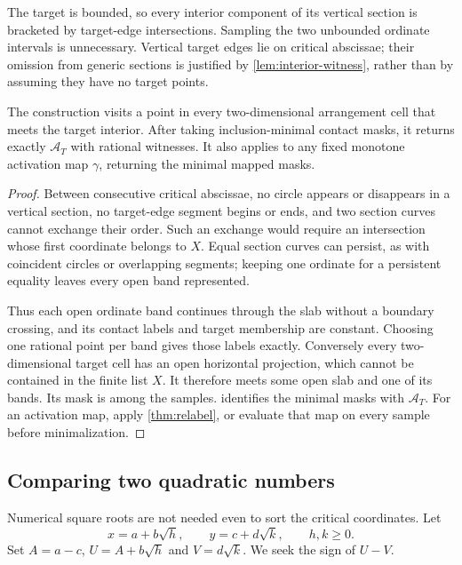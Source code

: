 The target is bounded, so every interior component of its vertical section is bracketed by target-edge intersections. Sampling the two unbounded ordinate intervals is unnecessary. Vertical target edges lie on critical abscissae; their omission from generic sections is justified by \cref{lem:interior-witness}, rather than by assuming they have no target points.

\begin{theorem}\label{thm:sweep}
The construction visits a point in every two-dimensional arrangement cell that meets the target interior. After taking inclusion-minimal contact masks, it returns exactly $\mathcal A_T$ with rational witnesses. It also applies to any fixed monotone activation map $\gamma$, returning the minimal mapped masks.
\end{theorem}
\begin{proof}
Between consecutive critical abscissae, no circle appears or disappears in a vertical section, no target-edge segment begins or ends, and two section curves cannot exchange their order. Such an exchange would require an intersection whose first coordinate belongs to $X$. Equal section curves can persist, as with coincident circles or overlapping segments; keeping one ordinate for a persistent equality leaves every open band represented.

Thus each open ordinate band continues through the slab without a boundary crossing, and its contact labels and target membership are constant. Choosing one rational point per band gives those labels exactly. Conversely every two-dimensional target cell has an open horizontal projection, which cannot be contained in the finite list $X$. It therefore meets some open slab and one of its bands. Its mask is among the samples.  identifies the minimal masks with $\mathcal A_T$. For an activation map, apply \cref{thm:relabel}, or evaluate that map on every sample before minimalization.
\end{proof}

\subsection{Comparing two quadratic numbers}
Numerical square roots are not needed even to sort the critical coordinates. Let
\[
x=a+b\sqrt h,\qquad y=c+d\sqrt k,\qquad h,k\ge0.
\]
Set $A=a-c$, $U=A+b\sqrt h$ and $V=d\sqrt k$. We seek the sign of $U-V$.

